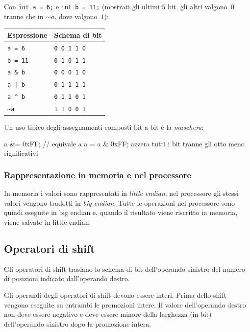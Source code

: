 \documentclass[11pt,a4paper]{article}
\begin{document}
\begin{esempio}
Con \lstinline|int a = 6;| e \lstinline|int b = 11;| (mostrati gli ultimi $5$ bit, gli altri valgono~$0$ tranne che in $\sim a$, dove valgono~$1$):
\begin{center}
\begin{tabular}{ll}
\toprule
Espressione & Schema di bit\\
\midrule
\lstinline|a = 6|  & \texttt{0\,0\,1\,1\,0}\\
\lstinline|b = 11| & \texttt{0\,1\,0\,1\,1}\\
\lstinline|a & b|  & \texttt{0\,0\,0\,1\,0}\\
\lstinline/a | b/  & \texttt{0\,1\,1\,1\,1}\\
\lstinline|a ^ b|  & \texttt{0\,1\,1\,0\,1}\\
\lstinline|~a|     & \texttt{1\,1\,0\,0\,1}\\
\bottomrule
\end{tabular}
\end{center}
\end{esempio}

Un uso tipico degli assegnamenti composti bit a bit è la \emph{maschera}:
\begin{codice}
a &= 0xFF;    // equivale a a = a & 0xFF; azzera tutti i bit tranne gli otto meno significativi
\end{codice}

\subsubsection{Rappresentazione in memoria e nel processore}

In memoria i valori sono rappresentati in \emph{little endian}; nel processore gli stessi valori vengono tradotti in \emph{big endian}. Tutte le operazioni nel processore sono quindi eseguite in big endian e, quando il risultato viene riscritto in memoria, viene salvato in little endian.

\subsection{Operatori di shift}

Gli operatori di shift traslano lo schema di bit dell'operando sinistro del numero di posizioni indicato dall'operando destro.

Gli operandi degli operatori di shift devono essere interi. Prima dello shift vengono eseguite su entrambi le promozioni intere. Il valore dell'operando destro non deve essere negativo e deve essere minore della larghezza (in bit) dell'operando sinistro dopo la promozione intera.
\end{document}
